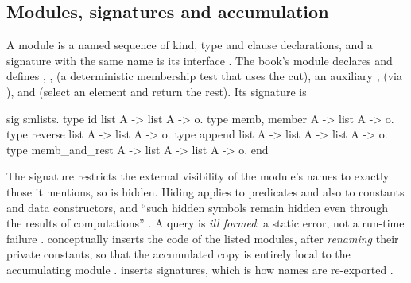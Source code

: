 \subsection{Modules, signatures and accumulation}

A module is a named sequence of kind, type and clause declarations, and a signature with the same name is
its interface . The book's module  declares and defines ,
,  (a deterministic membership test that uses the cut), an auxiliary
,  (via ),  and  (select an element and
return the rest). Its signature is
\begin{lprolog}
sig smlists.
type id              list A -> list A -> o.
type memb, member    A -> list A -> o.
type reverse         list A -> list A -> o.
type append          list A -> list A -> list A -> o.
type memb_and_rest   A -> list A -> list A -> o.
end
\end{lprolog}
The signature restricts the external visibility of the module's names to exactly those it mentions, so
 is hidden. Hiding applies to predicates and also to constants and data constructors, and
``such hidden symbols remain hidden even through the results of computations'' . A query
 is \emph{ill formed}: a static error, not a run-time failure .
 conceptually inserts the code of the listed modules, after \emph{renaming}
their private constants, so that the accumulated copy is entirely local to the accumulating module
.  inserts signatures, which is how names are re-exported .

